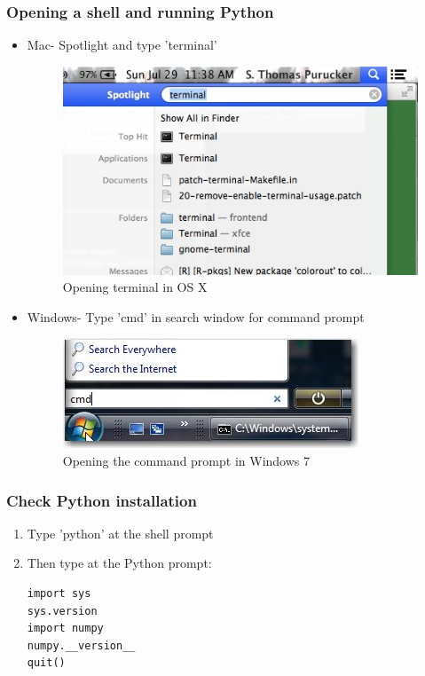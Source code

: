 \documentclass{beamer}
\begin{document}
\begin{frame}[fragile]
\frametitle{Opening a shell and running Python}
\begin{itemize}
  \item{Mac- Spotlight and type 'terminal'}
  \begin{figure}
 \includegraphics[scale=0.2]{mac_terminal.jpg} 
 \caption{Opening terminal in OS X}
\end{figure}
  \item{Windows- Type 'cmd' in search window for command prompt}
  \begin{figure}
 \includegraphics[scale=0.4]{win_cmd.jpg} 
 \caption{Opening the command prompt in Windows 7}
\end{figure}
\end{itemize} 
\end{frame}

\begin{frame}[fragile]
\frametitle{Check Python installation}
\begin{enumerate}
\item Type 'python' at the shell prompt
\item  Then type at the Python prompt:
\begin{lstlisting}
import sys
sys.version
import numpy
numpy.__version__
quit()
\end{lstlisting} 
\end{enumerate}
\end{frame}
\end{document}
